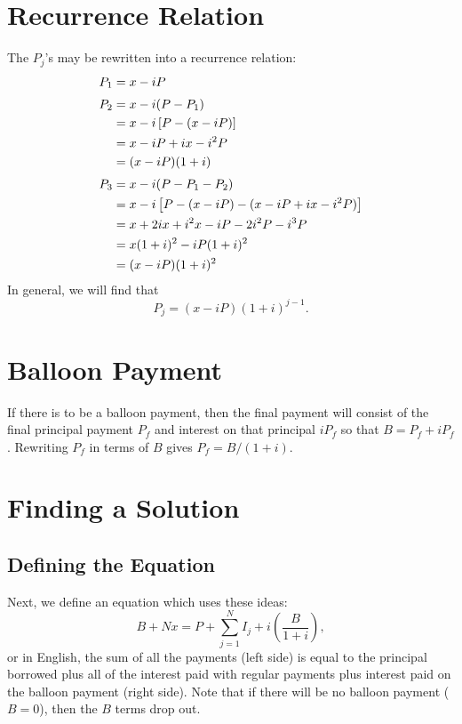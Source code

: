 \section{Recurrence Relation}
The $P_j$'s may be rewritten into a recurrence relation:
\begin{align*}
P_1 &{}= x - iP\\
\noalign{\smallskip}
P_2 &{}= x - i(P - P_1)\\
&{}= x - i\left[P - (x - iP)\right]\\
&{}= x - iP + ix - i^2P\\
&{}= (x - iP)(1 + i)\\
\noalign{\smallskip}
P_3 &{}= x - i(P - P_1 - P_2)\\
&{}= x - i\left[P - (x - iP) - (x - iP + ix - i^2P)\right]\\
&{}= x + 2ix + i^2x - iP - 2i^2P - i^3P\\
&{}= x(1 + i)^2 - iP(1 + i)^2\\
&{}= (x - iP)(1 + i)^2
\end{align*}
In general, we will find that
\begin{equation}
\label{amort:recurrence}
P_j = (x - iP)(1 + i)^{j-1}.
\end{equation}

\section{Balloon Payment}
If there is to be a balloon payment, then the final payment will
consist of the final principal payment $P_f$ and interest on that
principal $i P_f$ so that $B = P_f + iP_f$.  Rewriting $P_f$ in terms
of $B$ gives $P_f = B/(1+i)$.

\section{Finding a Solution}
\subsection{Defining the Equation}
Next, we define an equation which uses these ideas:
\begin{equation}
\label{amort:sums}
B + Nx = P + \sum_{j=1}^N I_j + i\left(\frac{B}{1+i}\right),
\end{equation}
or in English, the sum of all the payments (left side) is equal to the
principal borrowed plus all of the interest paid with regular payments
plus interest paid on the balloon payment (right side).
Note that if there will be no balloon payment ($B=0$), then the $B$
terms drop out.


